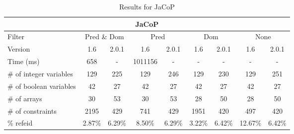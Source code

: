 \documentclass{standalone}
\begin{document}
\begin{table}[H]
\footnotesize
\begin{tabular}{lc|c|c|c|c|c|c|c}
\multicolumn{9}{c}{JaCoP} \\ 
\hline\hline Filter & \multicolumn{2}{c|}{Pred \& Dom} &\multicolumn{2}{c|}{Pred}  & \multicolumn{2}{c|}{Dom} & \multicolumn{2}{c}{None} \\ 
\hline Version & 1.6 & 2.0.1 & 1.6 & 2.0.1 & 1.6 & 2.0.1 & 1.6 & 2.0.1 \\ 
Time (ms)               & 658 & - & 1011156 & - & - & - & - & - \\ 
\# of integer variables & 129 & 225 & 129 & 246 & 129 & 230 & 129 & 251 \\ 
\# of boolean variables & 42 & 27 & 42 & 27 & 42 & 27 & 42 & 27 \\ 
\# of arrays            & 30 & 53 & 30 & 53 & 28 & 50 & 28 & 50 \\ 
\# of constraints       & 2195 & 429 & 741 & 429 & 1951 & 420 & 497 & 420 \\ 
\% refeid               & 2.87\% & 6.29\% & 8.50\% & 6.29\% & 3.22\% & 6.42\% & 12.67\% & 6.42\% \\ 
\end{tabular}
\caption{Results for JaCoP}
\end{table}
\end{document}
